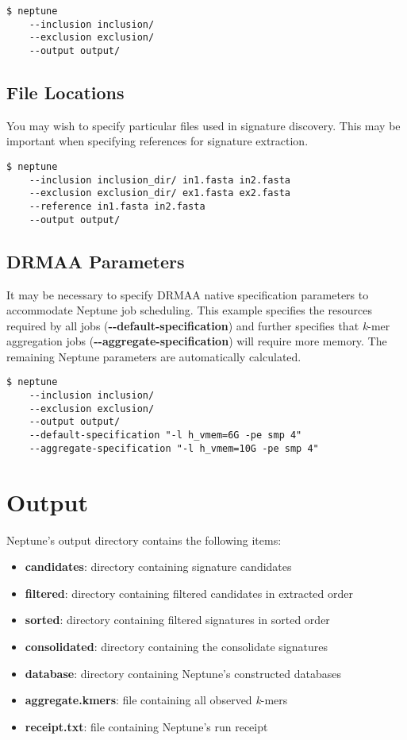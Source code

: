 \documentclass[a4paper,10pt]{article}
\begin{document}
\begin{lstlisting}
$ neptune
    --inclusion inclusion/
    --exclusion exclusion/
    --output output/ 
\end{lstlisting}

\subsection{File Locations}

You may wish to specify particular files used in signature discovery. This may be important when specifying references for signature extraction.

\begin{lstlisting}
$ neptune
    --inclusion inclusion_dir/ in1.fasta in2.fasta
    --exclusion exclusion_dir/ ex1.fasta ex2.fasta
    --reference in1.fasta in2.fasta    
    --output output/
\end{lstlisting}

\subsection{DRMAA Parameters}

It may be necessary to specify DRMAA native specification parameters to accommodate Neptune job scheduling. This example specifies the resources required by all jobs (\mbox{\textbf{-{}-default-specification}}) and further specifies that \textit{k}-mer aggregation jobs (\mbox{\textbf{-{}-aggregate-specification}}) will require more memory. The remaining Neptune parameters are automatically calculated.

\begin{lstlisting}
$ neptune
    --inclusion inclusion/
    --exclusion exclusion/
    --output output/
    --default-specification "-l h_vmem=6G -pe smp 4"
    --aggregate-specification "-l h_vmem=10G -pe smp 4"
\end{lstlisting}

\newpage
\section{Output}

Neptune's output directory contains the following items:

\begin{itemize}
  \item \textbf{candidates}: directory containing signature candidates
  \item \textbf{filtered}: directory containing filtered candidates in extracted order
  \item \textbf{sorted}: directory containing filtered signatures in sorted order
  \item \textbf{consolidated}: directory containing the consolidate signatures
  \item \textbf{database}: directory containing Neptune's constructed databases
  \item \textbf{aggregate.kmers}: file containing all observed \textit{k}-mers
  \item \textbf{receipt.txt}: file containing Neptune's run receipt
\end{itemize}
\end{document}
